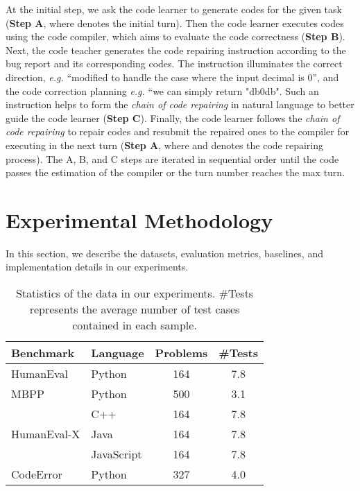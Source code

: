 \documentclass[11pt]{article}
\begin{document}
At the initial step, we ask the code learner to generate codes for the given task (\textbf{Step A}, where  denotes the initial turn). Then the code learner executes codes using the code compiler, which aims to evaluate the code correctness (\textbf{Step B}). Next, the code teacher generates the code repairing instruction according to the bug report and its corresponding codes. The instruction illuminates the correct direction, \textit{e.g.} ``modified to handle the case where
the input decimal is 0'', and the code correction planning \textit{e.g.} ``we can simply return "db0db". Such an instruction helps to form the \textit{chain of code repairing} in natural language to better guide the code learner (\textbf{Step C}). Finally, the code learner follows the \textit{chain of code repairing} to repair codes and resubmit the repaired ones to the compiler for executing in the next turn (\textbf{Step A}, where  and denotes the code repairing process). The A, B, and C steps are iterated in sequential order until the code passes the estimation of the compiler or the turn number reaches the max turn.

 





\section{Experimental Methodology}
In this section, we describe the datasets, evaluation metrics, baselines, and implementation details in our experiments.



\begin{table}[]
\small
\centering
\caption{Statistics of the data in our experiments. \#Tests represents the average number of test cases contained in each sample.}
\label{tab:data_statistic}
\begin{tabular}{llcc}
\hline
\textbf{Benchmark}           & \textbf{Language} & \textbf{Problems} & \textbf{\#Tests} \\ \hline
HumanEval                    & Python            & 164               & 7.8                \\ \hline
MBPP                         & Python            & 500               & 3.1                \\ \hline
\multirow{3}{*}{HumanEval-X} & C++               & 164               & 7.8                \\
                             & Java              & 164               & 7.8                \\
                             & JavaScript        & 164               & 7.8                \\ \hline
CodeError                    & Python            & 327               & 4.0                \\ \hline
\end{tabular}
\end{table}
\end{document}
